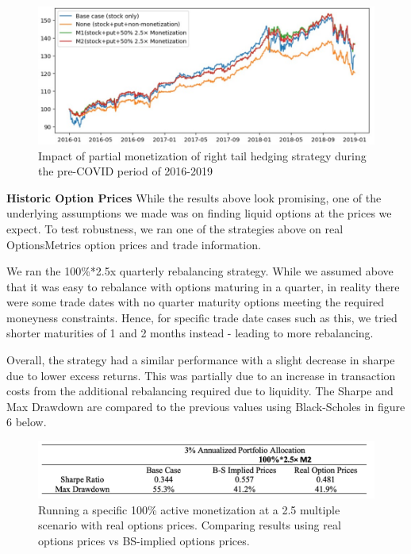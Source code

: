\documentclass[12pt]{article}
\begin{document}
{{\begin{figure}[htp]
    \centering
    \includegraphics[width=14cm]{right_tail_event2.jpg}
    \caption{Impact of partial monetization of right tail hedging strategy during the pre-COVID period of 2016-2019}
    \label{fig:galaxy}
\end{figure}

\textbf{Historic Option Prices}
While the results above look promising, one of the underlying assumptions we made was on finding liquid options at the prices we expect. To test robustness, we ran one of the strategies above on real OptionsMetrics option prices and trade information. 

We ran the 100\%*2.5x quarterly rebalancing strategy. While we assumed above that it was easy to rebalance with options maturing in a quarter, in reality there were some trade dates with no quarter maturity options meeting the required moneyness constraints. Hence, for specific trade date cases such as this, we tried shorter maturities of 1 and 2 months instead - leading to more rebalancing.

Overall, the strategy had a similar performance with a slight decrease in sharpe due to lower excess returns. This was partially due to an increase in transaction costs from the additional rebalancing required due to liquidity. The Sharpe and Max Drawdown are compared to the previous values using Black-Scholes in figure 6 below.

\begin{figure}[htp]
    \centering
    \includegraphics[width=14cm]
    {compare.jpg}
    \caption{Running a specific 100\% active monetization at a 2.5 multiple scenario with real options prices. Comparing results using real options prices vs BS-implied options prices.}
    \label{fig:galaxy}
\end{figure}

}}
\end{document}
